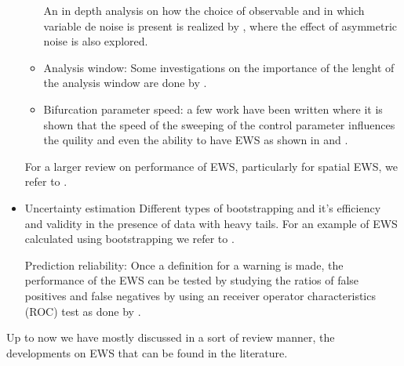 \begin{itemize}
\begin{itemize}
		An in depth  analysis on how the choice of observable and in which variable de noise is present is realized by \cite{Patterson2021}, where the effect of asymmetric noise is also explored.
		\item Analysis window: Some investigations on the importance of the lenght of the analysis window are done by \cite{Dutta2018}.
		\item Bifurcation parameter speed: a few work have been written where it is shown that the speed of the sweeping of the control parameter influences the quility and even the ability to have EWS as shown in \cite{Marcucci2019} and \cite{Kaur2022a}.		
	\end{itemize}
	
	For a larger review on performance of EWS, particularly for spatial EWS, we refer to \cite{Clements2018a,Feudel2018, Thompson2011}.
	
	\item Uncertainty estimation
	\subitem Different types of bootstrapping and it's efficiency and validity in the presence of data with heavy tails. For an example of EWS calculated using bootstrapping we refer to \cite{Bury2020}.
	
	\subitem Prediction reliability: Once a definition for a warning is made, the performance of the EWS can be tested by studying the ratios of false positives and false negatives by using an receiver operator characteristics (ROC) test as done by \citep{Boettiger2012a,Bury2020,Romano2018}.
	

\end{itemize}


\citep{Boettiger2012, Boettiger2013a}


Up to now we have mostly discussed in a sort of review manner, the developments on EWS that can be found in the literature. 

